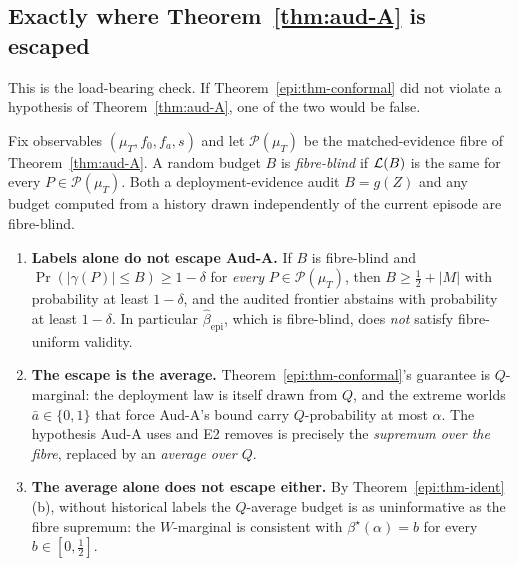 \subsection{Exactly where Theorem~\ref{thm:aud-A} is escaped}

This is the load-bearing check. If Theorem~\ref{epi:thm-conformal} did not violate a hypothesis of
Theorem~\ref{thm:aud-A}, one of the two would be false.

\begin{definition}\label{epi:def-fibreblind}
Fix observables $(\mu_T,f_0,f_a,s)$ and let $\mathcal P(\mu_T)$ be the matched-evidence fibre of
Theorem~\ref{thm:aud-A}. A random budget $B$ is \emph{fibre-blind} if $\mathcal{L}(B)$ is the same for every
$P\in\mathcal P(\mu_T)$. Both a deployment-evidence audit $B=g(Z)$ and any budget computed from a
history drawn independently of the current episode are fibre-blind.
\end{definition}

\begin{proposition}\label{epi:prop-escape}
\begin{enumerate}
\item[\textnormal{(a)}] \textbf{Labels alone do not escape Aud-A.} If $B$ is fibre-blind and
$\Pr(|\gamma(P)|\le B)\ge1-\delta$ for \emph{every} $P\in\mathcal P(\mu_T)$, then
$B\ge\tfrac12+|M|$ with probability at least $1-\delta$, and the audited frontier abstains with
probability at least $1-\delta$. In particular $\widehat\beta_{\mathrm{epi}}$, which is fibre-blind,
does \emph{not} satisfy fibre-uniform validity.
\item[\textnormal{(b)}] \textbf{The escape is the average.} Theorem~\ref{epi:thm-conformal}'s
guarantee is $Q$-marginal: the deployment law is itself drawn from $Q$, and the extreme worlds
$\bar a\in\{0,1\}$ that force Aud-A's bound carry $Q$-probability at most $\alpha$. The
hypothesis Aud-A uses and E2 removes is precisely the \emph{supremum over the fibre}, replaced by an
\emph{average over $Q$}.
\item[\textnormal{(c)}] \textbf{The average alone does not escape either.} By
Theorem~\ref{epi:thm-ident}(b), without historical labels the $Q$-average budget is as
uninformative as the fibre supremum: the $W$-marginal is consistent with $\beta^\star(\alpha)=b$ for
every $b\in[0,\tfrac12]$.
\end{enumerate}
\end{proposition}

